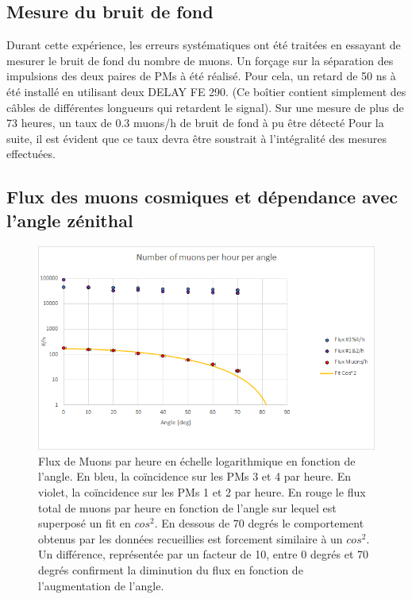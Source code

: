 \documentclass[12pt]{article}
\begin{document}
\subsection{Mesure du bruit de fond}

Durant cette expérience, les erreurs systématiques ont été traitées en essayant de mesurer le bruit de fond du nombre de muons. 
Un forçage sur la séparation des impulsions des deux paires de PMs à été réalisé. Pour cela, un retard de 50 ns  à été installé en utilisant deux DELAY FE 290. (Ce boîtier contient simplement des câbles de différentes longueurs qui retardent le signal). Sur une mesure de plus de 73 heures, un taux de 0.3 muons/h de bruit de fond à pu être détecté Pour la suite, il est évident que ce taux devra être soustrait à l'intégralité des mesures effectuées.


\subsection{Flux des muons cosmiques et dépendance avec l'angle zénithal}

\begin{figure}[!htbp]
    \centering
    \includegraphics[width=\textwidth]{graphiques/experience2/NumberMuonsPerHourPerAngle.png}
    \caption{Flux de Muons par heure en échelle logarithmique en fonction de l'angle. En bleu, la coïncidence sur les PMs 3 et 4 par heure. En violet, la coïncidence sur les PMs 1 et 2 par heure. En rouge le flux total de muons par heure en fonction de l'angle sur lequel est superposé un fit en $cos^2$. En dessous de 70 degrés le comportement obtenus par les données recueillies est forcement similaire à un $cos^2$. Un différence, représentée par un facteur de 10, entre 0 degrés et 70 degrés confirment la diminution du flux en fonction de l'augmentation de l'angle.}
    \label{fig:NumberMuonsPerHourPerAngle}
\end{figure}
\end{document}
